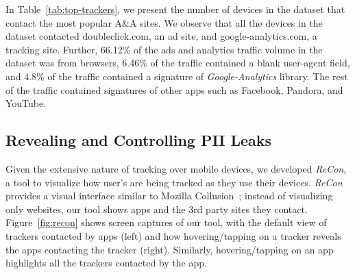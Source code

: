 In Table~\ref{tab:top-trackers}, we present the number of devices in the \mobWild dataset that contact the most popular A\&A sites.
We observe that all the devices in the \mobWild dataset contacted doubleclick.com, an ad site, and google-analytics.com, a tracking site. 
Further, 66.12\% of the ads and analytics traffic volume in the \mobWild dataset was from browsers, 6.46\% of the
traffic contained a blank user-agent field, and 4.8\% of the traffic contained a signature of \emph{Google-Analytics} library.
The rest of the traffic contained signatures of other apps such as Facebook, Pandora, and YouTube.

\subsection{Revealing and Controlling PII Leaks}
\label{subsec:recon}

Given the extensive nature of tracking over mobile devices, we developed  
\emph{ReCon}, a tool to visualize how user's are being tracked as they use their devices. 
\emph{ReCon} provides a visual interface similar to Mozilla Collusion~\cite{collusion}; instead of 
visualizing only websites, our tool shows apps and the 3rd party sites they contact. Figure~\ref{fig:recon} shows screen captures of our tool, with the default view of trackers contacted by apps (left) and how 
hovering/tapping on a tracker reveals the apps contacting the tracker (right). Similarly, hovering/tapping on an app 
highlights all the trackers contacted by the app.


